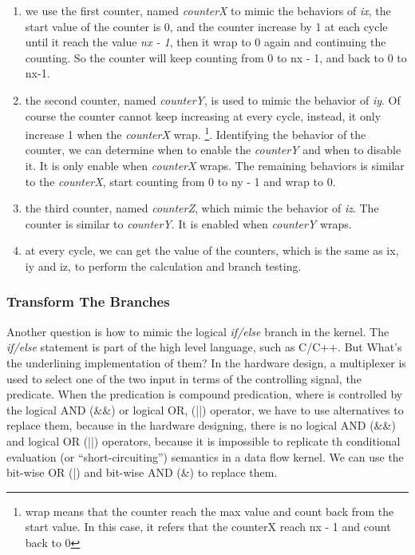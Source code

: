 \begin{enumerate}
  \item we use the first counter, named \emph{counterX} to mimic the
    behaviors of \emph{ix}, the start value of the counter is 0, and the
    counter increase by 1 at each cycle until it reach the value \emph{nx -
    1}, then it wrap to 0 again and continuing the counting. So the counter
    will keep counting from 0 to nx - 1, and back to 0 to nx-1.

  \item the second counter, named \emph{counterY}, is used to mimic the
    behavior of \emph{iy}. Of course the counter cannot keep increasing
    at every cycle, instead, it only increase 1 when the \emph{counterX}
    wrap. \footnote{wrap means that the counter reach the max value and
      count back from the start value. In this case, it refers that the
    counterX reach nx - 1 and count back to 0}. Identifying the behavior
    of the counter, we can determine when to enable the \emph{counterY}
    and when to disable it. It is only enable when \emph{counterX}
    wraps. The remaining behaviors is similar to the \emph{counterX},
    start counting from 0 to ny - 1 and wrap to 0.

  \item the third counter, named \emph{counterZ}, which mimic the behavior
    of \emph{iz}. The counter is similar to \emph{counterY}. It is enabled
    when \emph{counterY} wraps.

    \item at every cycle, we can get the value of the counters, which is the
      same as ix, iy and iz, to perform the calculation and branch testing.

\end{enumerate}


\subsubsection{Transform The Branches} %
\label{ssub:Transform The Br}
Another question is how to mimic the logical \emph{if/else} branch in the
kernel. The \emph{if/else} statement is part of the high level language,
such as C/C++. But What's the underlining implementation of them? In the
hardware design, a multiplexer is used to select one of the two input in
terms of the controlling signal, the predicate. When  the predication
is compound predication, where is controlled by the logical AND (\&\&) or
logical OR, (||) operator, we have to use alternatives to replace them,
because in the hardware designing, there is no logical AND (\&\&) and
logical OR (||)
operators, because it is impossible to replicate th conditional evaluation
(or ``short-circuiting'') semantics in a data flow kernel. We can use the
bit-wise OR (|) and bit-wise AND (\&) to replace them.

